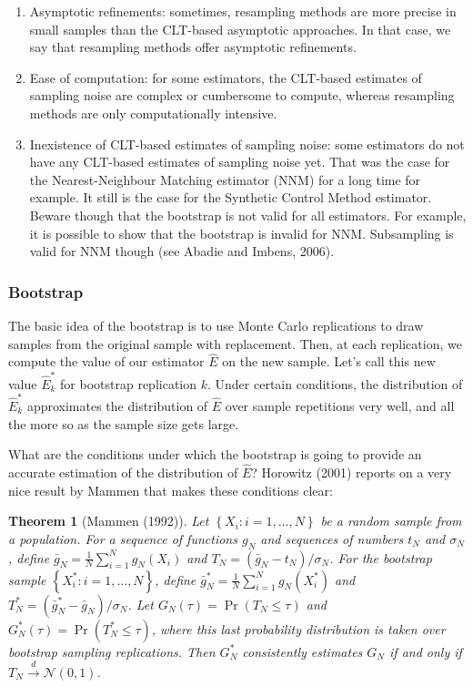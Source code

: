 \documentclass[
]{book}
\providecommand{\tightlist}{%
  \setlength{\itemsep}{0pt}\setlength{\parskip}{0pt}}
\newtheorem{theorem}{Theorem}[chapter]
\theoremstyle{definition}
\theoremstyle{definition}
\theoremstyle{definition}
\theoremstyle{definition}
\theoremstyle{remark}
\begin{document}
\begin{enumerate}
\def\labelenumi{\arabic{enumi}.}
\tightlist
\item
  Asymptotic refinements: sometimes, resampling methods are more precise in small samples than the CLT-based asymptotic approaches.
  In that case, we say that resampling methods offer asymptotic refinements.
\item
  Ease of computation: for some estimators, the CLT-based estimates of sampling noise are complex or cumbersome to compute, whereas resampling methods are only computationally intensive.
\item
  Inexistence of CLT-based estimates of sampling noise: some estimators do not have any CLT-based estimates of sampling noise yet.
  That was the case for the Nearest-Neighbour Matching estimator (NNM) for a long time for example.
  It still is the case for the Synthetic Control Method estimator.
  Beware though that the bootstrap is not valid for all estimators.
  For example, it is possible to show that the bootstrap is invalid for NNM.
  Subsampling is valid for NNM though (see Abadie and Imbens, 2006).
\end{enumerate}

\hypertarget{bootstrap}{%
\subsubsection{Bootstrap}\label{bootstrap}}

The basic idea of the bootstrap is to use Monte Carlo replications to draw samples from the original sample with replacement.
Then, at each replication, we compute the value of our estimator \(\hat{E}\) on the new sample.
Let's call this new value \(\hat{E}^*_k\) for bootstrap replication \(k\).
Under certain conditions, the distribution of \(\hat{E}^*_k\) approximates the distribution of \(\hat{E}\) over sample repetitions very well, and all the more so as the sample size gets large.

What are the conditions under which the bootstrap is going to provide an accurate estimation of the distribution of \(\hat{E}\)?
Horowitz (2001) reports on a very nice result by Mammen that makes these conditions clear:

\begin{theorem}[Mammen (1992)]
\protect\hypertarget{thm:mammen92}{}{\label{thm:mammen92} \iffalse (Mammen (1992)) \fi{} }Let \(\left\{X_i:i=1,\dots,N\right\}\) be a random sample from a population.
For a sequence of functions \(g_N\) and sequences of numbers \(t_N\) and \(\sigma_N\), define \(\bar{g}_N=\frac{1}{N}\sum_{i=1}^Ng_N(X_i)\) and \(T_N=(\bar{g}_N-t_N)/\sigma_N\).
For the bootstrap sample \(\left\{X^*_i:i=1,\dots,N\right\}\), define \(\bar{g}^*_N=\frac{1}{N}\sum_{i=1}^Ng_N(X^*_i)\) and \(T^*_N=(\bar{g}^*_N-\bar{g}_N)/\sigma_N\).
Let \(G_N(\tau)=\Pr(T_N\leq\tau)\) and \(G^*_N(\tau)=\Pr(T^*_N\leq\tau)\), where this last probability distribution is taken over bootstrap sampling replications.
Then \(G^*_N\) consistently estimates \(G_N\) if and only if \(T_N\stackrel{d}{\rightarrow}\mathcal{N}(0,1)\).
\end{theorem}
\end{document}
